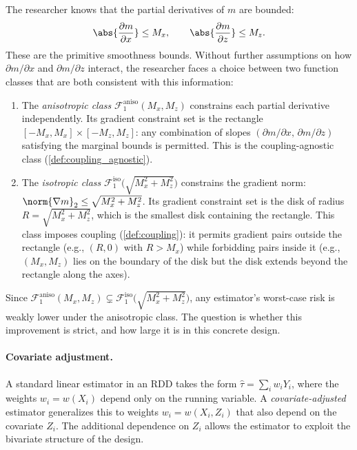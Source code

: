 The researcher knows that the partial derivatives of $m$ are bounded:
\begin{equation*}
	\abs{\frac{\partial m}{\partial x}} \leq M_x, \qquad \abs{\frac{\partial m}{\partial z}} \leq M_z.
\end{equation*}
These are the primitive smoothness bounds.
Without further assumptions on how $\partial m / \partial x$ and $\partial m / \partial z$ interact, the researcher faces a choice between two function classes that are both consistent with this information:

\begin{enumerate}
	\item The \emph{anisotropic class} $\mathcal{F}_1^{\mathrm{aniso}}(M_x, M_z)$ constrains each partial derivative independently.
	Its gradient constraint set is the rectangle $[-M_x, M_x] \times [-M_z, M_z]$: any combination of slopes $(\partial m / \partial x,\, \partial m / \partial z)$ satisfying the marginal bounds is permitted.
	This is the coupling-agnostic class (\cref{def:coupling_agnostic}).

	\item The \emph{isotropic class} $\mathcal{F}_1^{\mathrm{iso}}\!\bigl(\sqrt{M_x^2 + M_z^2}\bigr)$ constrains the gradient norm: $\norm{\nabla m}_2 \leq \sqrt{M_x^2 + M_z^2}$.
	Its gradient constraint set is the disk of radius $R = \sqrt{M_x^2 + M_z^2}$, which is the smallest disk containing the rectangle.
	This class imposes coupling (\cref{def:coupling}): it permits gradient pairs outside the rectangle (e.g., $(R, 0)$ with $R > M_x$) while forbidding pairs inside it (e.g., $(M_x, M_z)$ lies on the boundary of the disk but the disk extends beyond the rectangle along the axes).
\end{enumerate}

Since $\mathcal{F}_1^{\mathrm{aniso}}(M_x, M_z) \subsetneq \mathcal{F}_1^{\mathrm{iso}}\!\bigl(\sqrt{M_x^2 + M_z^2}\bigr)$, any estimator's worst-case risk is weakly lower under the anisotropic class.
The question is whether this improvement is strict, and how large it is in this concrete design.

\paragraph{Covariate adjustment.}
A standard linear estimator in an RDD takes the form $\hat\tau = \sum_i w_i Y_i$, where the weights $w_i = w(X_i)$ depend only on the running variable.
A \emph{covariate-adjusted} estimator generalizes this to weights $w_i = w(X_i, Z_i)$ that also depend on the covariate $Z_i$.
The additional dependence on $Z_i$ allows the estimator to exploit the bivariate structure of the design.

